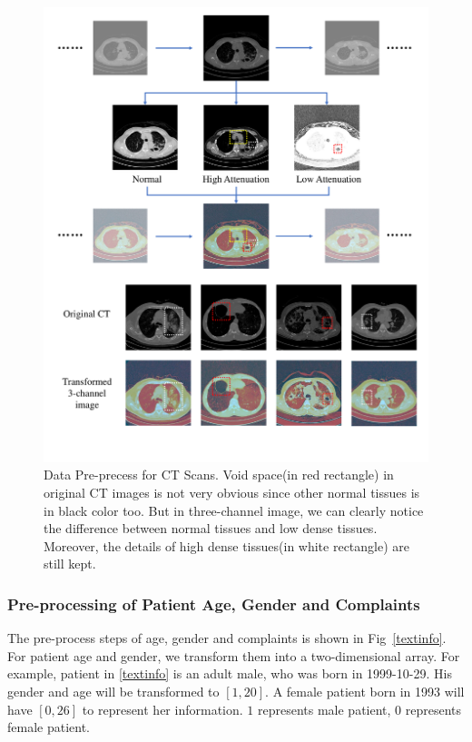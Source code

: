 \documentclass[journal]{IEEEtran}
\begin{document}
\begin{figure}[!t]
    \centerline{\includegraphics[width=150mm]{3channel.pdf}}
    \vspace{-1cm}
    \caption{Data Pre-precess for CT Scans. Void space(in red rectangle) in original CT images is not very obvious since other normal tissues is in black color too. But in three-channel image, we can clearly notice the difference between normal tissues and low dense tissues. Moreover, the details of high dense tissues(in white rectangle) are still kept. }
    \vspace{-0cm}
    \label{3channel}
    \end{figure}

\subsubsection{Pre-processing of Patient Age, Gender and Complaints}
\label{textdata}
The pre-process steps of age, gender and complaints is shown in Fig~\ref{textinfo}. 
For patient age and gender, we transform them into a two-dimensional array. For example, patient in \ref{textinfo} is an adult male, who was born in 1999-10-29. His gender and age will be transformed to $[1, 20]$. A female patient born in 1993 will have $[0, 26]$ to represent her information. $1$ represents male patient, $0$ represents female patient.
\end{document}
